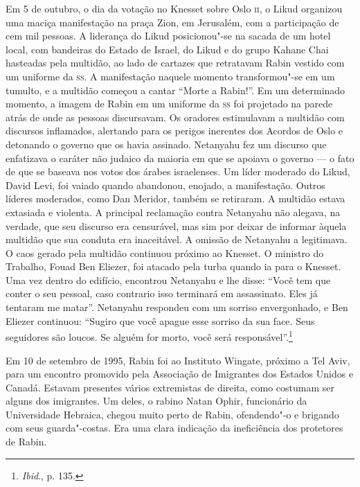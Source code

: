 Em 5 de outubro, o dia da votação no Knesset sobre Oslo \textsc{ii}, o Likud
organizou uma maciça manifestação na praça Zion, em Jerusalém, com a
participação de cem mil pessoas. A liderança do Likud posicionou"-se na
sacada de um hotel local, com bandeiras do Estado de Israel, do Likud e
do grupo Kahane Chai hasteadas pela multidão, ao lado de cartazes que
retratavam Rabin vestido com um uniforme da \textsc{ss}. A manifestação naquele
momento transformou"-se em um tumulto, e a multidão começou a cantar
``Morte a Rabin!''. Em um determinado momento, a imagem de Rabin em um
uniforme da \textsc{ss} foi projetado na parede atrás de onde as pessoas
discursavam. Os oradores estimulavam a multidão com discursos
inflamados, alertando para os perigos inerentes dos Acordos de Oslo e
detonando o governo que os havia assinado. Netanyahu fez um discurso que
enfatizava o caráter não judaico da maioria em que se apoiava o governo
--- o fato de que se baseava nos votos dos árabes israelenses. Um líder
moderado do Likud, David Levi, foi vaiado quando abandonou, enojado, a
manifestação. Outros líderes moderados, como Dan Meridor, também se
retiraram. A multidão estava extasiada e violenta. A principal
reclamação contra Netanyahu não alegava, na verdade, que seu discurso era
censurável, mas sim por deixar de informar àquela multidão que sua
conduta era inaceitável. A omissão de Netanyahu a legitimava. O caos
gerado pela multidão continuou próximo ao Knesset. O ministro do
Trabalho, Fouad Ben Eliezer, foi atacado pela turba quando ia para o
Knesset. Uma vez dentro do edifício, encontrou Netanyahu e lhe disse:
``Você tem que conter o seu pessoal, caso contrario isso terminará em
assassinato. Eles já tentaram me matar''. Netanyahu respondeu com um
sorriso envergonhado, e Ben Eliezer continuou: ``Sugiro que você apague
esse sorriso da sua face. Seus seguidores são loucos. Se alguém for
morto, você será responsável''.\footnote{\emph{Ibid}., p. 135.}

Em 10 de setembro de 1995, Rabin foi ao Instituto Wingate, próximo a Tel
Aviv, para um encontro promovido pela Associação de Imigrantes dos
Estados Unidos e Canadá. Estavam presentes vários extremistas de
direita, como costumam ser alguns dos imigrantes. Um deles, o rabino
Natan Ophir, funcionário da Universidade Hebraica, chegou muito perto de
Rabin, ofendendo"-o e brigando com seus guarda"-costas. Era uma clara
indicação da ineficiência dos protetores de Rabin.

